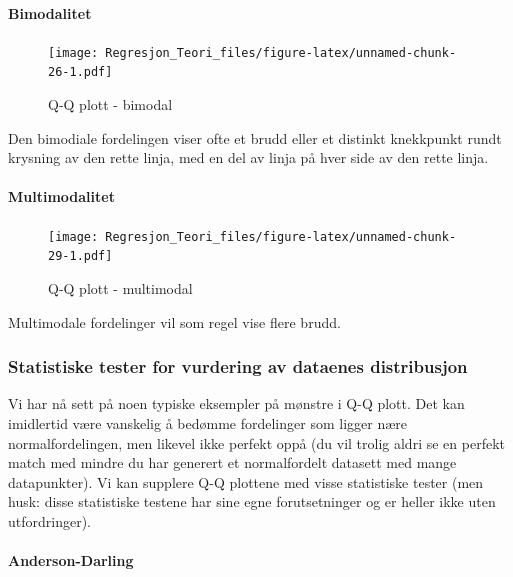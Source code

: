 \documentclass[
]{article}
\begin{document}
\hypertarget{bimodalitet}{%
\paragraph{Bimodalitet}\label{bimodalitet}}

\begin{figure}
\centering
\texttt{[image: Regresjon\_Teori\_files/figure-latex/unnamed-chunk-26-1.pdf]}
\caption{Q-Q plott - bimodal}
\end{figure}

Den bimodiale fordelingen viser ofte et brudd eller et distinkt
knekkpunkt rundt krysning av den rette linja, med en del av linja på
hver side av den rette linja.

\hypertarget{multimodalitet}{%
\paragraph{Multimodalitet}\label{multimodalitet}}

\begin{figure}
\centering
\texttt{[image: Regresjon\_Teori\_files/figure-latex/unnamed-chunk-29-1.pdf]}
\caption{Q-Q plott - multimodal}
\end{figure}

Multimodale fordelinger vil som regel vise flere brudd.

\hypertarget{statistiske-tester-for-vurdering-av-dataenes-distribusjon}{%
\subsubsection{Statistiske tester for vurdering av dataenes
distribusjon}\label{statistiske-tester-for-vurdering-av-dataenes-distribusjon}}

Vi har nå sett på noen typiske eksempler på mønstre i Q-Q plott. Det kan
imidlertid være vanskelig å bedømme fordelinger som ligger nære
normalfordelingen, men likevel ikke perfekt oppå (du vil trolig aldri se
en perfekt match med mindre du har generert et normalfordelt datasett
med mange datapunkter). Vi kan supplere Q-Q plottene med visse
statistiske tester (men husk: disse statistiske testene har sine egne
forutsetninger og er heller ikke uten utfordringer).

\hypertarget{anderson-darling}{%
\paragraph{Anderson-Darling}\label{anderson-darling}}
\end{document}
